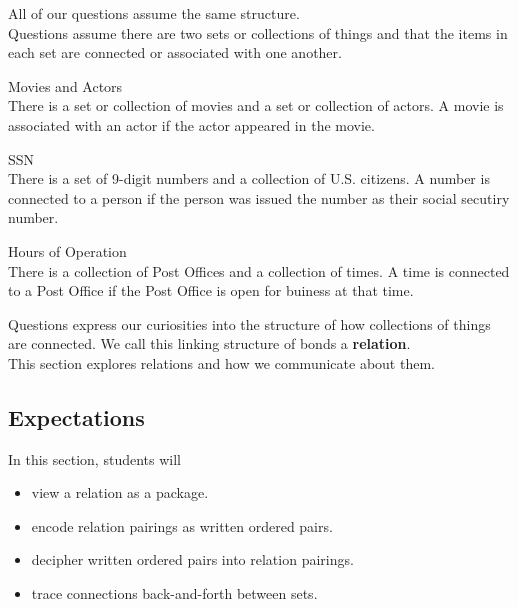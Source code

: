\documentclass{ximera}
\begin{document}
All of our questions assume the same structure.  \\

Questions assume there are two sets or collections of things and that the items in each set are connected or associated with one another.



\begin{example} Movies and Actors \\
There is a set or collection of movies and a set or collection of actors.  A movie is associated with an actor if the actor appeared in the movie.
\end{example}

\begin{example} SSN \\
There is a set of 9-digit numbers and a collection of U.S. citizens.  A number is connected to a person if the person was issued the number as their social secutiry number.
\end{example}

\begin{example} Hours of Operation \\
There is a collection of Post Offices and a collection of times.  A time is connected to a Post Office if the Post Office is open for buiness at that time.
\end{example}




Questions express our curiosities into the structure of how collections of things are connected. We call this linking structure of bonds a \textbf{relation}. \\


This section explores relations and how we communicate about them. \\










\subsection{Expectations}

\begin{sectionOutcomes}
In this section, students will 

\begin{itemize}
\item view a relation as a package.
\item encode relation pairings as written ordered pairs.
\item decipher written ordered pairs into relation pairings.
\item trace connections back-and-forth between sets.
\end{itemize}
\end{sectionOutcomes}
\end{document}
